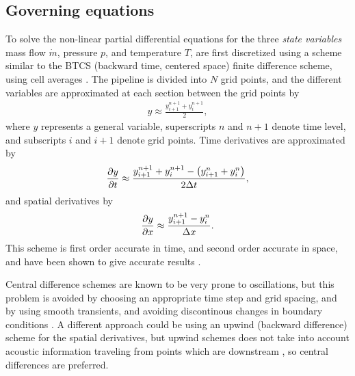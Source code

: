 \subsection{Governing equations}
\label{subsec:governingNumerical}
To solve the non-linear partial differential equations for the three \emph{state variables} mass flow $\dot m$, pressure $p$, and temperature $T$,  are first discretized using a scheme similar to the BTCS (backward time, centered space) finite difference scheme, using cell averages \cite{Kiuchi1993Implicit,Abbaspour2004Dynamic}. The pipeline is divided into $N$ grid points, and the different variables are approximated at each section between the grid points by
\begin{align}
    y \approx \frac{y^{n+1}_{i+1} + y^{n+1}_{i}}{2}
, \label{eq:variablesScheme}
\end{align}
where $y$ represents a general variable, superscripts $n$ and $n+1$ denote time level, and subscripts $i$ and $i+1$ denote grid points. Time derivatives are approximated by
\begin{align}
    \pdt{y} \approx 
    \frac{y^{n+1}_{i+1} + y^{n+1}_{i} - \del{y^{n}_{i+1} + y^{n}_{i}}}{2\Delta t}
, \label{eq:timeScheme}
\end{align}
and spatial derivatives by
\begin{align}
    \pdx{y} \approx
    \frac{y^{n+1}_{i+1} - y^{n}_{i}}{\Delta x}
. \label{eq:spatialScheme}
\end{align}
This scheme is first order accurate in time, and second order accurate in space, and have been shown to give accurate results \cite{Abbaspour2008Nonisothermal,Helgaker2014Validation}. 

Central difference schemes are known to be very prone to oscillations, but this problem is avoided by choosing an appropriate time step and grid spacing, and by using smooth transients, and avoiding discontinous changes in boundary conditions \cite{Abbaspour2008Nonisothermal}. A different approach could be using an upwind (backward difference) scheme for the spatial derivatives, but upwind schemes does not take into account acoustic information traveling from points which are downstream \cite{Helgaker2014Transient}, so central differences are preferred.

